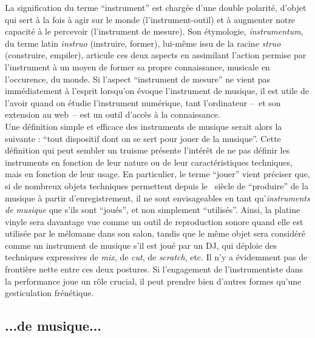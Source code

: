 \noindent La signification du terme ``instrument'' est chargée d'une double polarité, d'objet qui sert à la fois à agir sur le monde (l'instrument-outil) et à augmenter notre capacité à le percevoir (l'instrument de mesure). Son étymologie, \textit{instrumentum}, du terme latin \textit{instruo} (instruire, former), lui-même issu de la racine \textit{struo} (construire, empiler), articule ces deux aspects en assimilant l'action permise par l'instrument à un moyen de former sa propre connaissance, musicale en l'occurence, du monde. Si l'aspect ``instrument de mesure'' ne vient pas immédiatement à l'esprit lorsqu'on évoque l'instrument de musique, il est utile de l'avoir quand on étudie l'instrument numérique, tant l'ordinateur --~et son extension au web~-- est un outil d'accès à la connaissance.\\
\indent Une définition simple et efficace des instruments de musique serait alors la suivante : ``tout dispositif dont on se sert pour jouer de la musique''. Cette définition qui peut sembler un truisme présente l'intérêt de ne pas définir les instruments en fonction de leur nature ou de leur caractéristiques techniques, mais en fonction de leur usage. En particulier, le terme ``jouer'' vient préciser que, si de nombreux objets techniques permettent depuis le ~siècle de ``produire'' de la musique à partir d'enregistrement, il ne sont envisageables en tant qu'\textit{instruments de musique} que s'ils sont ``joués'', et non simplement ``utilisés''. Ainsi, la platine vinyle sera davantage vue comme un outil de reproduction sonore quand elle est utilisée par le mélomane dans son salon, tandis que le même objet sera considéré comme un instrument de musique s'il est joué par un \gls{DJ}, qui déploie des techniques expressives de \textit{mix}, de \textit{cut}, de \textit{scratch}, etc. Il n'y a évidemment pas de frontière nette entre ces deux postures. Si l'engagement de l'instrumentiste dans la performance joue un rôle crucial, il peut prendre bien d'autres formes qu'une gesticulation frénétique.\\

\subsection*{...de musique...}

